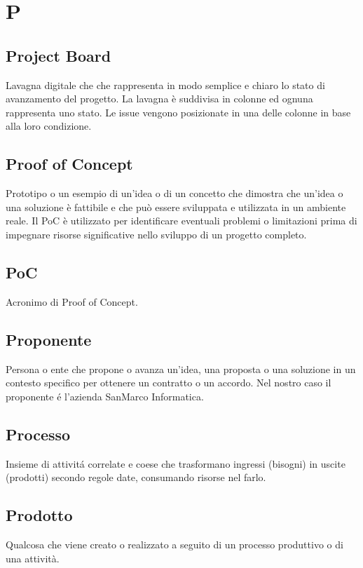 \section{P}
\subsection{Project Board}%
Lavagna digitale che che rappresenta in modo semplice e chiaro lo stato di avanzamento del progetto. La lavagna è suddivisa in colonne ed ognuna rappresenta uno stato.  Le issue vengono posizionate in una delle colonne in base alla loro condizione.
\subsection{Proof of Concept}%
Prototipo o un esempio di un'idea o di un concetto che dimostra che un'idea o una soluzione è fattibile e che può essere sviluppata e 
utilizzata in un ambiente reale. Il PoC è utilizzato per identificare eventuali problemi o limitazioni prima di impegnare risorse 
significative nello sviluppo di un progetto completo.
\subsection{PoC}%
Acronimo di Proof of Concept.
\subsection{Proponente}%
Persona o ente che propone o avanza un'idea, una proposta o una soluzione in un contesto specifico 
per ottenere un contratto o un accordo.
Nel nostro caso il proponente é l'azienda SanMarco Informatica.
\subsection{Processo}%
Insieme di attivitá correlate e coese che trasformano
ingressi (bisogni) in uscite (prodotti) secondo regole date,
consumando risorse nel farlo.
\subsection{Prodotto}%
Qualcosa che viene creato o realizzato a seguito di un processo 
produttivo o di una attività.

\clearpage